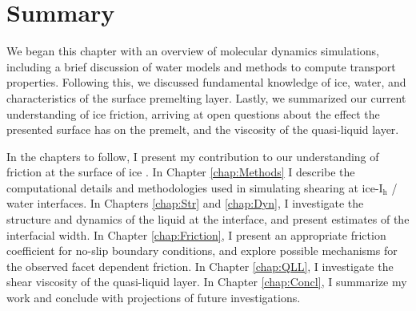 



\section{Summary}
We began this chapter with an overview of molecular dynamics
simulations, including a brief discussion of water models and methods
to compute transport properties. Following this, we discussed
fundamental knowledge of ice, water, and characteristics of the
surface premelting layer. Lastly, we summarized our current
understanding of ice friction, arriving at open questions about the
effect the presented surface has on the premelt, and the
viscosity of the quasi-liquid layer.

In the chapters to follow, I present my contribution to our
understanding of friction at the surface of ice . In Chapter
\ref{chap:Methods} I describe the computational details and
methodologies used in simulating shearing at ice-I$_\mathrm{h}$ /
water interfaces. In Chapters \ref{chap:Str} and \ref{chap:Dyn}, I
investigate the structure and dynamics of the liquid at the interface,
and present estimates of the interfacial width. In Chapter
\ref{chap:Friction}, I present an appropriate friction coefficient for
no-slip boundary conditions, and explore possible mechanisms for the
observed facet dependent friction. In Chapter \ref{chap:QLL}, I
investigate the shear viscosity of the quasi-liquid layer. In Chapter
\ref{chap:Concl}, I summarize my work and conclude with projections
of future investigations.


